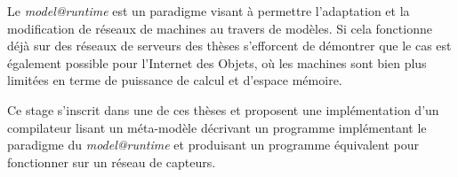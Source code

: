 \pagestyle{empty}

\vspace*{\fill}
\begin{center}

Le \emph{model@runtime} est un paradigme visant à permettre l'adaptation et la modification de réseaux de machines au travers de modèles. Si cela fonctionne déjà sur des réseaux de serveurs des thèses s'efforcent de démontrer que le cas est également possible pour l'Internet des Objets, où les machines sont bien plus limitées en terme de puissance de calcul et d'espace mémoire.

Ce stage s'inscrit dans une de ces thèses et proposent une implémentation d'un compilateur lisant un méta-modèle décrivant un programme implémentant le paradigme du \emph{model@runtime} et produisant un programme équivalent pour fonctionner sur un réseau de capteurs.
\end{center}
\vspace*{\fill}